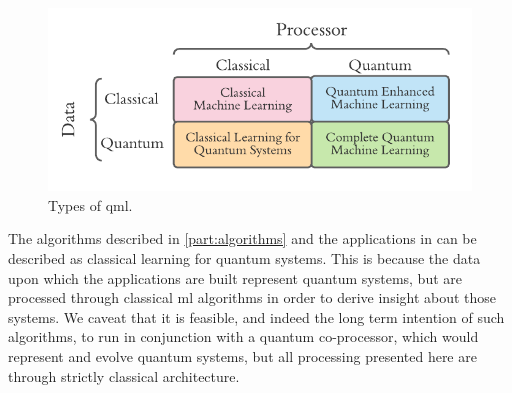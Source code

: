 \begin{figure}[t]
    \begin{center}
        \includegraphics{contextual_review/figures/qml_types.pdf}
    \end{center}
    \caption[Types of quantum machine learning]{Types of \acrlong{qml}.}
    \label{fig:qml_types}
\end{figure}

\par 

The algorithms described in \cref{part:algorithms} and the applications in 
    can be described as classical learning for quantum systems. 
This is because the data upon which the applications are built represent quantum systems, 
    but are processed through classical \gls{ml} algorithms in order to derive insight about those systems.
We caveat that it is feasible, and indeed the long term intention of such algorithms, 
    to run in conjunction with a quantum co-processor, which would represent and evolve quantum systems, 
    but all processing presented here are through strictly classical architecture.

